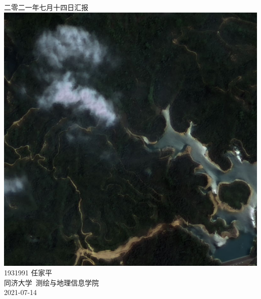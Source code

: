 \documentclass[a4paper, 12pt]{article}
\begin{document}
\begin{center}
    {\Huge 
        二零二一年七月十四日汇报}\\[20pt]
    
    \includegraphics[scale=0.4]{pic/cover.jpg} \\[15pt] 

    {\Large 
        1931991 任家平\\[12pt]
        同济大学~测绘与地理信息学院\\[12pt]
        2021-07-14}
\end{center}
\thispagestyle{empty}



\newpage
{}
\tableofcontents
\newpage
{}



\listoffigures
{}
\listoftables
{}
\newpage
\nocite{*}

% 
\end{document}
